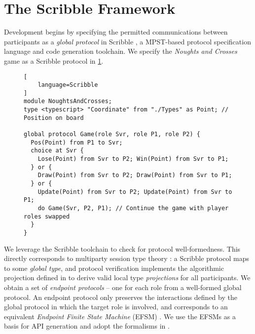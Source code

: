 \section{The Scribble Framework}
\label{section:scribble}

Development begins by specifying the permitted communications between
participants as a \textit{global protocol} in Scribble \cite{Scribble}, a
MPST-based protocol specification language and code generation toolchain.
We specify the \textit{Noughts and Crosses} game as a Scribble protocol in
\cref{lst:game}.

\begin{figure}[!h]
\begin{lstlisting}[
	language=Scribble
]
module NoughtsAndCrosses;
type <typescript> "Coordinate" from "./Types" as Point;	// Position on board

global protocol Game(role Svr, role P1, role P2) {
  Pos(Point) from P1 to Svr;
  choice at Svr {
    Lose(Point) from Svr to P2; Win(Point) from Svr to P1;
  } or {
    Draw(Point) from Svr to P2; Draw(Point) from Svr to P1;
  } or {
    Update(Point) from Svr to P2; Update(Point) from Svr to P1;
    do Game(Svr, P2, P1); // Continue the game with player roles swapped
  }
}
\end{lstlisting}
\label{lst:game}
\end{figure}

We leverage the Scribble toolchain to check for protocol
well-formedness.
This directly corresponds to multiparty session
type theory \cite{MPST}:
a Scribble protocol maps to some \textit{global type}, and protocol
verification implements the algorithmic projection defined in \cite{MPST} to
derive valid local type \textit{projections} for all participants.
We obtain a set of \textit{endpoint protocols} -- one for each role from a
well-formed global protocol.
An endpoint protocol only preserves the interactions defined by the global
protocol in which the target role is involved, and corresponds to an equivalent
\textit{Endpoint Finite State Machine} (EFSM) \cite{ICALP13CFSM}.
We use the EFSMs as a basis for API generation and adopt the formalisms in
\cite{Hybrid2016}.


